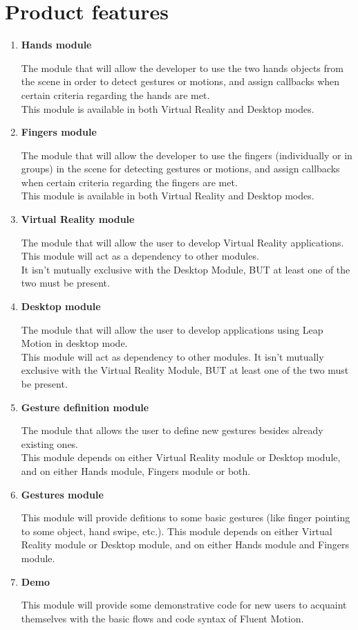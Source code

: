 \documentclass[12pt,a4paper,twoside]{report}
\begin{document}
\section{Product features}
\begin{enumerate}
  \item \textbf{Hands module}

    The module that will allow the developer to use the two hands objects from the scene in order to detect gestures or motions, and assign callbacks when certain criteria regarding the hands are met.\\
    This module is available in both Virtual Reality and Desktop modes.

  \item \textbf{Fingers module}

    The module that will allow the developer to use the fingers (individually or in groups) in the scene for detecting gestures or motions, and assign callbacks when certain criteria regarding the fingers are met.\\
    This module is available in both Virtual Reality and Desktop modes.

  \item \textbf{Virtual Reality module}

    The module that will allow the user to develop Virtual Reality applications.   This module will act as a dependency to other modules. \\
    It isn’t mutually exclusive with the Desktop Module, BUT at least one of the two must be present.

  \item \textbf{Desktop module}

    The module that will allow the user to develop applications using Leap Motion in desktop mode.\\
    This module will act as dependency to other modules. It isn’t mutually exclusive with the Virtual Reality Module, BUT at least one of the two must be present.
  
  \item \textbf{Gesture definition module}
    
    The module that allows the user to define new gestures besides already existing ones.\\
    This module depends on either Virtual Reality module or Desktop module, and on either Hands module, Fingers module or both.

  \item \textbf{Gestures module}

    This module will provide defitions to some basic gestures (like finger pointing to some object, hand swipe, etc.).
    This module depends on either Virtual Reality module or Desktop module, and on either Hands module and Fingers module.

  \item \textbf{Demo}

    This module will provide some demonstrative code for new users to acquaint themselves with the basic flows and code syntax of Fluent Motion.
  
\end{enumerate}
\end{document}
